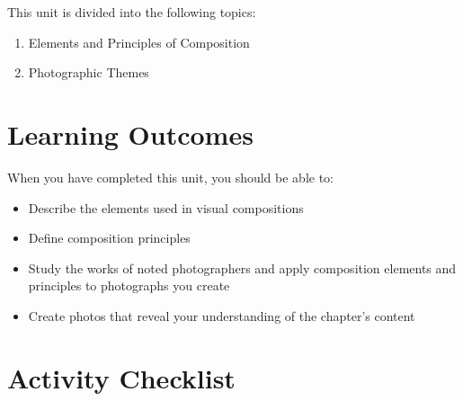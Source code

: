 \documentclass[
]{book}
\providecommand{\tightlist}{%
  \setlength{\itemsep}{0pt}\setlength{\parskip}{0pt}}
\begin{document}
This unit is divided into the following topics:

\begin{enumerate}
\def\labelenumi{\arabic{enumi}.}
\tightlist
\item
  Elements and Principles of Composition
\item
  Photographic Themes
\end{enumerate}

\hypertarget{learning-outcomes-2}{%
\section*{Learning Outcomes}\label{learning-outcomes-2}}

When you have completed this unit, you should be able to:

\begin{itemize}
\tightlist
\item
  Describe the elements used in visual compositions\\
\item
  Define composition principles\\
\item
  Study the works of noted photographers and apply composition elements and principles to photographs you create\\
\item
  Create photos that reveal your understanding of the chapter's content
\end{itemize}

\hypertarget{activity-checklist-2}{%
\section*{Activity Checklist}\label{activity-checklist-2}}
\end{document}
